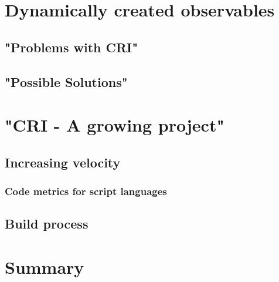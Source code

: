 \section{Dynamically created observables}

	\subsection{"Problems with CRI"}

	\subsection{"Possible Solutions"}
	
	
\section{"CRI - A growing project"}

	\subsection{Increasing velocity}
	
	\subsubsection{Code metrics for script languages}
	
	\subsection{Build process}
	
\section{Summary}

	



